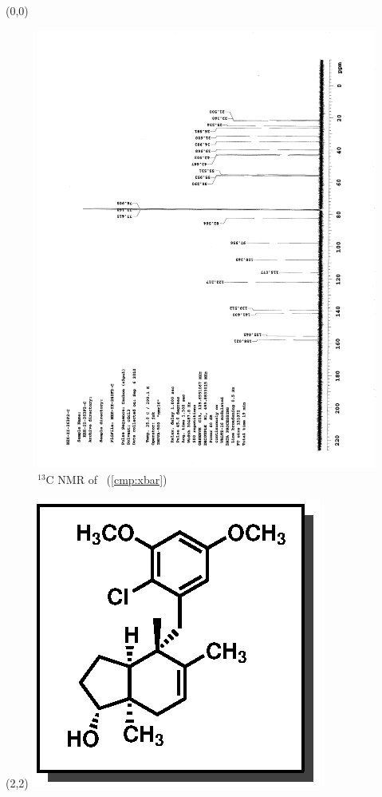 \clearpage
\begin{textblock}{20}(0,0)
\begin{figure}[htb]
\caption{$^{13}$C NMR of  \CMPxbar\ (\ref{cmp:xbar})}
\includegraphics[scale=0.75, trim = 0mm 0mm 0mm 5mm,
clip]{chp_singlecarbon/images/nmr/xbarC}
\vspace{-100pt}
\end{figure}
\end{textblock}
\begin{textblock}{1}(2,2)
\includegraphics[scale=0.8, angle=90]{chp_singlecarbon/images/xbar}
\end{textblock}
\clearpage

